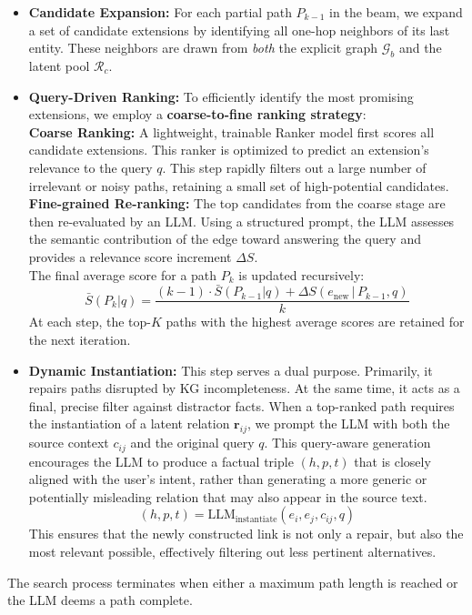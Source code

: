 \documentclass[letterpaper]{article} %
\begin{document}
\begin{itemize}
\item[] \textbf{Candidate Expansion:} For each partial path $P_{k-1}$ in the beam, we expand a set of candidate extensions by identifying all one-hop neighbors of its last entity. These neighbors are drawn from \textit{both} the explicit graph $\mathcal{G}_b$ and the latent pool $\mathcal{R}_c$.

\item[] \textbf{Query-Driven Ranking:} To efficiently identify the most promising extensions, we employ a \textbf{coarse-to-fine ranking strategy}:\\
    \textbf{Coarse Ranking:} A lightweight, trainable Ranker model first scores all candidate extensions. This ranker is optimized to predict an extension's relevance to the query $q$. This step rapidly filters out a large number of irrelevant or noisy paths, retaining a small set of high-potential candidates.\\
    \textbf{Fine-grained Re-ranking:} The top candidates from the coarse stage are then re-evaluated by an LLM. Using a structured prompt, the LLM assesses the semantic contribution of the edge toward answering the query and provides a relevance score increment $\Delta S$.\\
The final average score for a path \(P_k\) is updated recursively:
\[
\bar{S}(P_k|q) = \frac{(k-1) \cdot \bar{S}(P_{k-1}|q) + \Delta S(e_{\text{new}}\,|\,P_{k-1}, q)}{k}
\]
At each step, the top-\(K\) paths with the highest average scores are retained for the next iteration.

\item[] \textbf{Dynamic Instantiation:} This step serves a dual purpose. Primarily, it repairs paths disrupted by KG incompleteness. At the same time, it acts as a final, precise filter against distractor facts. When a top-ranked path requires the instantiation of a latent relation \(\mathbf{r}_{ij}\), we prompt the LLM with both the source context \(c_{ij}\) and the original query \(q\). This query-aware generation encourages the LLM to produce a factual triple \((h, p, t)\) that is closely aligned with the user's intent, rather than generating a more generic or potentially misleading relation that may also appear in the source text.
\[
(h, p, t) = \text{LLM}_{\text{instantiate}}(e_i, e_j, c_{ij}, q)
\]
This ensures that the newly constructed link is not only a repair, but also the most relevant possible, effectively filtering out less pertinent alternatives.
\end{itemize}
The search process terminates when either a maximum path length is reached or the LLM deems a path complete.
\end{document}
